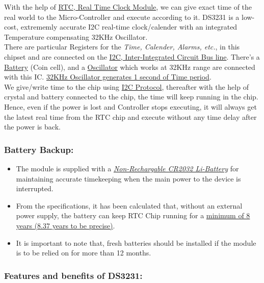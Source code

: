\documentclass[11pt,a4paper]{article}
\begin{document}
With the help of \uline{RTC, Real Time Clock Module}, we can give exact time of the real world to the Micro-Controller and execute according to it. DS3231 is a low-cost, extrememly accurate I2C real-time clock/calender with an integrated Temperature compensating 32KHz Oscillator.\\ 

There are particular Registers for the \textit{Time, Calender, Alarms, etc.}, in this chipset and are connected on the \uline{I2C, Inter-Integrated Circuit Bus line}.
There's a \uline{Battery} (Coin cell), and a \uline{Oscillator} which works at 32KHz range are connected with this IC. \uline{32KHz Oscillator generates 1 second of Time period}.\\

We give/write time to the chip using \uline{I2C Protocol}, thereafter with the help of crystal and battery connected to the chip, the time will keep running in the chip. Hence, even if the power is lost and Controller stops executing, it will always get the latest real time from the RTC chip and execute without any time delay after the power is back.\\

\subsubsection{Battery Backup:}

\begin{itemize}
\item The module is supplied with a \uline{\textit{Non-Rechargable CR2032 Li-Battery}} for maintaining accurate timekeeping when the main power to the device is interrupted.

\item From the specifications, it has been calculated that, without an external power supply, the battery can keep RTC Chip running for a \uline{minimum of 8 years (8.37 years to be precise)}.

\item It is important to note that, fresh batteries should be installed if the module is to be relied on for more than 12 months.
\end{itemize} 

\subsubsection{Features and benefits of DS3231:}
\end{document}
